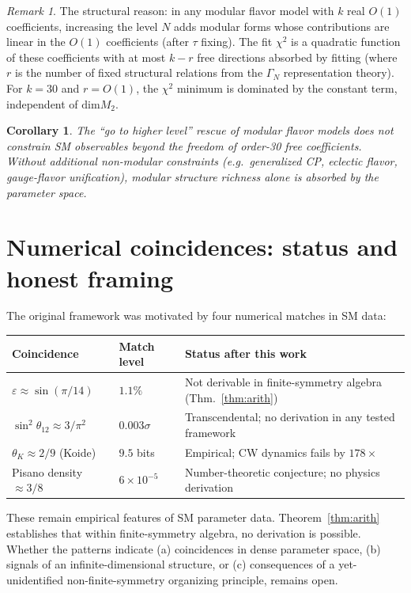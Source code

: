 \documentclass[11pt,a4paper]{amsart}
\newtheorem{corollary}[theorem]{Corollary}
\theoremstyle{definition}
\theoremstyle{remark}
\newtheorem{remark}[theorem]{Remark}
\newcommand{\dimm}{\mathrm{dim}}
\begin{document}
\begin{remark}
The structural reason: in any modular flavor model with $k$ real $O(1)$
coefficients, increasing the level $N$ adds modular forms whose contributions
are linear in the $O(1)$ coefficients (after $\tau$ fixing). The fit $\chi^2$
is a quadratic function of these coefficients with at most $k - r$ free
directions absorbed by fitting (where $r$ is the number of fixed structural
relations from the $\Gamma_N$ representation theory). For $k = 30$ and
$r = O(1)$, the $\chi^2$ minimum is dominated by the constant term,
independent of $\dimm M_2$.
\end{remark}

\begin{corollary}
The ``go to higher level'' rescue of modular flavor models does not
constrain SM observables beyond the freedom of order-30 free coefficients.
Without additional non-modular constraints (e.g.\ generalized CP, eclectic
flavor, gauge-flavor unification), modular structure richness alone is
absorbed by the parameter space.
\end{corollary}

\section{Numerical coincidences: status and honest framing}

The original framework was motivated by four numerical matches in SM data:

\begin{center}
\begin{tabular}{lll}
\toprule
Coincidence & Match level & Status after this work \\
\midrule
$\varepsilon \approx \sin(\pi/14)$ & $1.1\%$ & Not derivable in finite-symmetry algebra (Thm.~\ref{thm:arith}) \\
$\sin^2 \theta_{12} \approx 3/\pi^2$ & $0.003\sigma$ & Transcendental; no derivation in any tested framework \\
$\theta_K \approx 2/9$ (Koide) & $9.5$ bits & Empirical; CW dynamics fails by $178\times$ \\
Pisano density $\approx 3/8$ & $6\times 10^{-5}$ & Number-theoretic conjecture; no physics derivation \\
\bottomrule
\end{tabular}
\end{center}

These remain empirical features of SM parameter data. Theorem~\ref{thm:arith}
establishes that within finite-symmetry algebra, no derivation is possible.
Whether the patterns indicate (a) coincidences in dense parameter space,
(b) signals of an infinite-dimensional structure, or (c) consequences of a
yet-unidentified non-finite-symmetry organizing principle, remains open.
\end{document}
